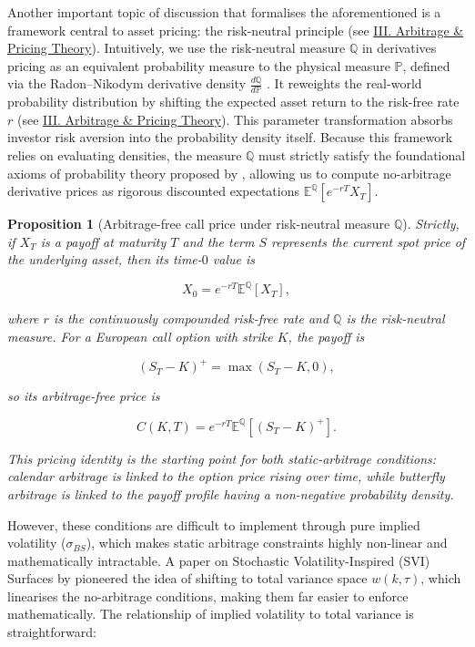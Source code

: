 \documentclass[12pt,oneside]{report}
\newtheorem{proposition}[theorem]{Proposition}
\theoremstyle{definition}
\theoremstyle{remark}
\begin{document}
Another important topic of discussion that formalises the aforementioned is a framework central to asset pricing: the risk-neutral principle (see \hyperref[sec:glossary_arbitrage_pricing_theory]{III. Arbitrage \& Pricing Theory}). Intuitively, we use the risk-neutral measure $\mathbb{Q}$ in derivatives pricing as an equivalent probability measure to the physical measure $\mathbb{P}$, defined via the Radon--Nikodym derivative density $\frac{d\mathbb{Q}}{d\mathbb{P}}$ \cite{harrison1979martingales, shreve2004stochastic}. It reweights the real-world probability distribution by shifting the expected asset return to the risk-free rate $r$ (see \hyperref[sec:glossary_arbitrage_pricing_theory]{III. Arbitrage \& Pricing Theory}). This parameter transformation absorbs investor risk aversion into the probability density itself. Because this framework relies on evaluating densities, the measure $\mathbb{Q}$ must strictly satisfy the foundational axioms of probability theory proposed by \citet{kolmogorov1933foundations}, allowing us to compute no-arbitrage derivative prices as rigorous discounted expectations $\mathbb{E}^{\mathbb{Q}}[e^{-rT} X_T]$.

\begin{proposition}[Arbitrage-free call price under risk-neutral measure $\mathbb{Q}$]

Strictly, if $X_T$ is a payoff at maturity $T$ and the term $S$ represents the current spot price of the underlying asset, then its time-$0$ value is

\[X_0 = e^{-rT}\mathbb{E}^{\mathbb{Q}}[X_T],\]

where $r$ is the continuously compounded risk-free rate and $\mathbb{Q}$ is the risk-neutral measure. For a European call option with strike $K$, the payoff is

\[(S_T - K)^+ = \max(S_T - K, 0),\]

so its arbitrage-free price is

\[C(K,T) = e^{-rT}\mathbb{E}^{\mathbb{Q}}[(S_T - K)^+].\]

This pricing identity is the starting point for both static-arbitrage conditions: calendar arbitrage is linked to the option price rising over time, while butterfly arbitrage is linked to the payoff profile having a non-negative probability density.
\end{proposition}

However, these conditions are difficult to implement through pure implied volatility (\(\sigma _{BS}\)), which makes static arbitrage constraints highly non-linear and mathematically intractable. A paper on Stochastic Volatility-Inspired (SVI) Surfaces by \citet{gatheral2014arbitrage} pioneered the idea of shifting to total variance space \(w(k, \tau)\), which linearises the no-arbitrage conditions, making them far easier to enforce mathematically. The relationship of implied volatility to total variance is straightforward:
\end{document}
